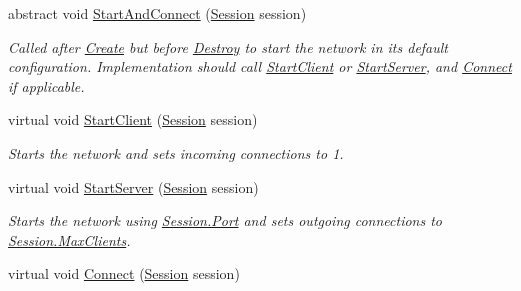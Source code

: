 \begin{DoxyCompactItemize}
\item 
abstract void \hyperlink{class_skyrates_1_1_common_1_1_network_1_1_network_common_a6cbb9a1ca4aaa056654300abed7de642}{Start\-And\-Connect} (\hyperlink{class_skyrates_1_1_common_1_1_network_1_1_session}{Session} session)
\begin{DoxyCompactList}\small\item\em Called after \hyperlink{class_skyrates_1_1_common_1_1_network_1_1_network_common_a575172eb9f965e181e19649bcce38ca0}{Create} but before \hyperlink{class_skyrates_1_1_common_1_1_network_1_1_network_common_aa00266a16aa27dfd0eb242c74856a92a}{Destroy} to start the network in its default configuration. Implementation should call \hyperlink{class_skyrates_1_1_common_1_1_network_1_1_network_common_a982b732d621ff3f8738319053af8d154}{Start\-Client} or \hyperlink{class_skyrates_1_1_common_1_1_network_1_1_network_common_ac1209cf3fc31d2f145678971472ec20c}{Start\-Server}, and \hyperlink{class_skyrates_1_1_common_1_1_network_1_1_network_common_aa11961a4a6dc22c782552eb96e27c6e1}{Connect} if applicable. \end{DoxyCompactList}\item 
virtual void \hyperlink{class_skyrates_1_1_common_1_1_network_1_1_network_common_a982b732d621ff3f8738319053af8d154}{Start\-Client} (\hyperlink{class_skyrates_1_1_common_1_1_network_1_1_session}{Session} session)
\begin{DoxyCompactList}\small\item\em Starts the network and sets incoming connections to 1. \end{DoxyCompactList}\item 
virtual void \hyperlink{class_skyrates_1_1_common_1_1_network_1_1_network_common_ac1209cf3fc31d2f145678971472ec20c}{Start\-Server} (\hyperlink{class_skyrates_1_1_common_1_1_network_1_1_session}{Session} session)
\begin{DoxyCompactList}\small\item\em Starts the network using \hyperlink{class_skyrates_1_1_common_1_1_network_1_1_session_aed90ad75336095fa3287c961aba40c7b}{Session.\-Port} and sets outgoing connections to \hyperlink{class_skyrates_1_1_common_1_1_network_1_1_session_a4d9934f0f98f603daf947afacf49d3fb}{Session.\-Max\-Clients}. \end{DoxyCompactList}\item 
virtual void \hyperlink{class_skyrates_1_1_common_1_1_network_1_1_network_common_aa11961a4a6dc22c782552eb96e27c6e1}{Connect} (\hyperlink{class_skyrates_1_1_common_1_1_network_1_1_session}{Session} session)

\end{DoxyCompactItemize}
